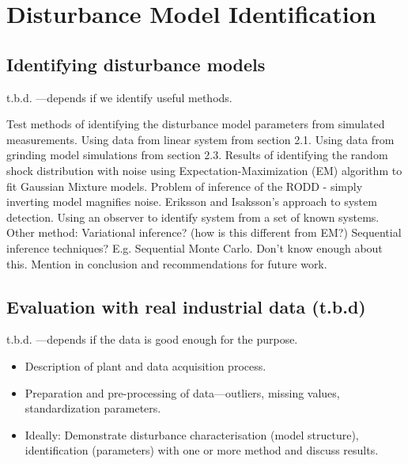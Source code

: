 \chapter{Disturbance Model Identification}
\label{chap-identification}

\section{Identifying disturbance models}

t.b.d. —depends if we identify useful methods.

\begin{outline}
	\1 Test methods of identifying the disturbance model parameters from simulated measurements.
	\2 Using data from linear system from section 2.1.
	\2 Using data from grinding model simulations from section 2.3.
	\1 Results of identifying the random shock distribution with noise using Expectation-Maximization (EM) algorithm to fit Gaussian Mixture models.
	\1 Problem of inference of the RODD - simply inverting model magnifies noise.
	\1 Eriksson and Isaksson's approach to system detection. Using an observer to identify system from a set of known systems.
	\1 Other method: Variational inference? (how is this different from EM?)
	\1 Sequential inference techniques? E.g. Sequential Monte Carlo. Don't know enough about this. Mention in conclusion and recommendations for future work.
\end{outline}

\section{Evaluation with real industrial data (t.b.d)}

t.b.d. —depends if the data is good enough for the purpose.

\begin{itemize}
	\item Description of plant and data acquisition process.
	\item Preparation and pre-processing of data—outliers, missing values, standardization parameters.
	\item Ideally: Demonstrate disturbance characterisation (model structure), identification (parameters) with one or more method and discuss results. 
\end{itemize}